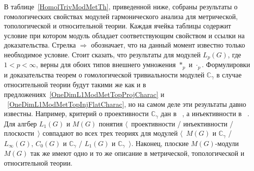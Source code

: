 \documentclass{article}
\numberwithin{equation}{section}
\theoremstyle{plain}
\theoremstyle{definition}
\newcommand{\convol}{\ast}
\begin{document}
\begin{fulltext}
В таблице~\ref{HomolTrivModMetTh}, приведенной ниже, собраны результаты о
гомологических свойствах модулей гармонического анализа для метрической,
топологической и относительной теории. Каждая ячейка таблицы содержит условие
при котором модуль обладает соответствующим свойством и ссылки на
доказательства. Стрелка $\Longrightarrow$ обозначает, что на данный момент
известно только необходимое условие. Стоит сказать, что результаты для модулей
$L_p(G)$, где $1<p<\infty$, верны для обоих типов внешнего умножения $\convol_p$
и $\cdot_p$. Формулировки и доказательства теорем о гомологической тривиальности
модулей $\mathbb{C}_\gamma$ в случае относительной теории будут такими же как и
в предложениях~\ref{OneDimL1ModMetTopProjCharac} и
~\ref{OneDimL1ModMetTopInjFlatCharac}, но на самом деле эти результаты давно
известны. Например, критерий о проективности $\mathbb{C}_\gamma$ дан в
~\cite[теорема~IV.5.13]{HelBanLocConvAlg}, а инъективности в
~\cite[теорема~2.5]{JohnCohomolBanAlg}. Для алгбер $L_1(G)$ и $M(G)$ понятия
$\langle$~проективности / инъективности / плоскости~$\rangle$ совпадают во всех
трех теориях для модулей $\langle$~$M(G)$ и $\mathbb{C}_\gamma$ / $L_\infty(G)$,
$C_0(G)$ и $\mathbb{C}_\gamma$ / $L_1(G)$ и $\mathbb{C}_\gamma$~$\rangle$.
Наконец, плоские $M(G)$-модули $M(G)$ так же имеют одно и то же описание в
метрической, топологической и относительной теории.


\end{fulltext}
\end{document}
